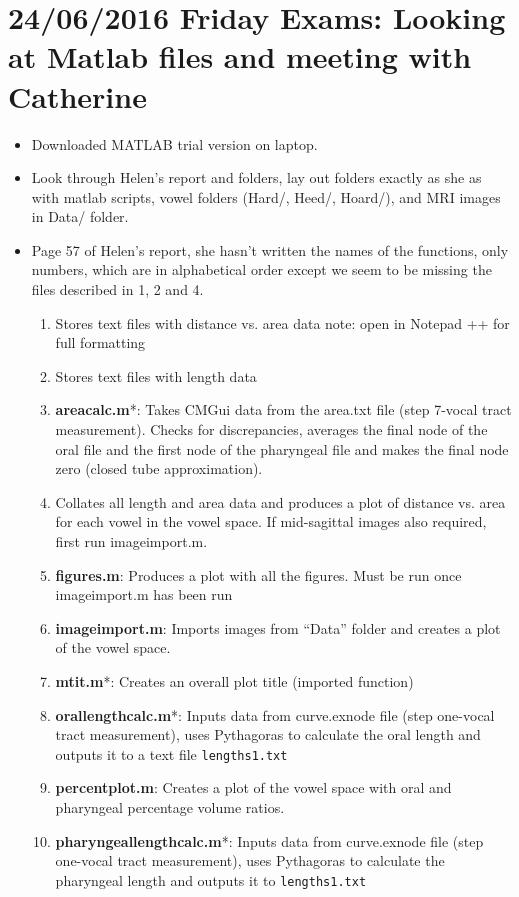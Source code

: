 \documentclass{article}
\begin{document}
\section*{24/06/2016 Friday Exams: Looking at Matlab files and meeting with Catherine}
\begin{itemize}
    
    \item Downloaded MATLAB trial version on laptop.
    \item Look through Helen's report and folders, lay out folders exactly as she as with matlab scripts, vowel folders (Hard/, Heed/, Hoard/), and MRI images in Data/ folder.
    \item Page 57 of Helen's report, she hasn't written the names of the functions, only numbers, which are in alphabetical order except we seem to be missing the files described in 1, 2 and 4.
    \begin{enumerate}
        \item Stores text files with distance vs. area data note: open in Notepad ++ for full formatting
        \item Stores text files with length data
        \item \textbf{areacalc.m}*: Takes CMGui data from the area.txt file (step 7-vocal tract measurement). Checks for discrepancies, averages the final node of the oral file and the first node of the pharyngeal file and makes the final node zero (closed tube approximation).
        \item Collates all length and area data and produces a plot of distance vs. area for each vowel in the vowel space. If mid-sagittal images also required, first run imageimport.m.
        \item \textbf{figures.m}: Produces a plot with all the figures. Must be run once imageimport.m has been run
        \item \textbf{imageimport.m}: Imports images from “Data” folder and creates a plot of the vowel space.
        \item \textbf{mtit.m}*: Creates an overall plot title (imported function)
        \item \textbf{orallengthcalc.m}*: Inputs data from curve.exnode file (step one-vocal tract measurement), uses Pythagoras to calculate the oral length and outputs it to a text file \verb|lengths1.txt|
        \item \textbf{percentplot.m}: Creates a plot of the vowel space with oral and pharyngeal percentage volume ratios.
        \item \textbf{pharyngeallengthcalc.m}*: Inputs data from curve.exnode file (step one-vocal tract measurement), uses Pythagoras to calculate the pharyngeal length and outputs it to \verb|lengths1.txt|

\end{enumerate}
\end{itemize}
\end{document}
